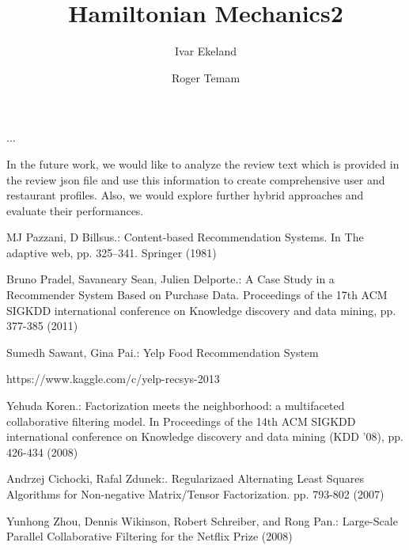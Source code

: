 \documentclass{llncs}
\begin{document}
 ...
 
 In the future work, we would like to analyze the review text which is provided in the review json file and use this information to create comprehensive user and restaurant profiles. Also, we would explore further hybrid approaches and evaluate their performances.

%
%
\begin{thebibliography}{}
%
MJ Pazzani, D Billsus.:
Content-based Recommendation Systems. In The adaptive web, pp. 325–341. Springer (1981) 

Bruno Pradel, Savaneary Sean, Julien Delporte.: 
A Case Study in a Recommender System Based on Purchase Data. Proceedings of the 17th ACM SIGKDD international conference on Knowledge discovery and data mining, pp. 377-385 (2011)

Sumedh Sawant, Gina Pai.:
Yelp Food Recommendation System

https://www.kaggle.com/c/yelp-recsys-2013

Yehuda Koren.: 
Factorization meets the neighborhood: a multifaceted collaborative filtering model. In Proceedings of the 14th ACM SIGKDD international conference on Knowledge discovery and data mining (KDD '08), pp. 426-434 (2008)

Andrzej Cichocki, Rafal Zdunek:. Regularizaed Alternating Least Squares Algorithms for Non-negative Matrix/Tensor Factorization. pp. 793-802 (2007)

Yunhong Zhou, Dennis Wikinson, Robert Schreiber, and Rong Pan.: Large-Scale Parallel Collaborative Filtering for the Netflix Prize (2008)

\end{thebibliography}

%
%
\title{Hamiltonian Mechanics2}

\author{Ivar Ekeland \and Roger Temam}

\end{document}
